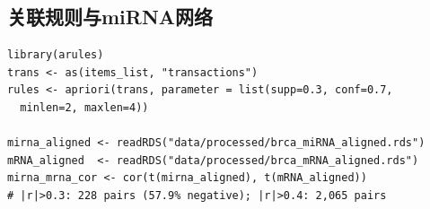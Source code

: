 \documentclass[12pt,a4paper]{ctexart}
\begin{document}
\subsection{关联规则与miRNA网络}
\begin{lstlisting}[caption={Apriori关联规则与miRNA-mRNA相关}, basicstyle=\ttfamily\scriptsize]
library(arules)
trans <- as(items_list, "transactions")
rules <- apriori(trans, parameter = list(supp=0.3, conf=0.7,
  minlen=2, maxlen=4))

mirna_aligned <- readRDS("data/processed/brca_miRNA_aligned.rds")
mRNA_aligned  <- readRDS("data/processed/brca_mRNA_aligned.rds")
mirna_mrna_cor <- cor(t(mirna_aligned), t(mRNA_aligned))
# |r|>0.3: 228 pairs (57.9% negative); |r|>0.4: 2,065 pairs
\end{lstlisting}
\end{document}
